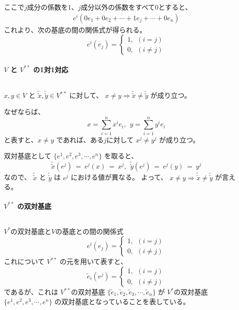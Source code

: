 \documentclass[uplatex,a4j,12pt,dvipdfmx]{jsarticle}
\begin{document}
ここで$j$成分の係数を1、$j$成分以外の係数をすべて0とすると、
\[
	\begin{array}{rcl}
		e^{i} (0 e_{1} + 0 e_{2}  + \cdots + 1 e_{j} + \cdots + 0 e_{n})
	\end{array}
\]
これより、次の基底の間の関係式が得られる。
\[
	e^{i}(e_{j})
	=
	\left\{
	\begin{array}{l}
		1, \ \ (i=j) \\
		0, \ \ (i \neq j)
	\end{array}
	\right.
\]

\paragraph{$V$ と $V^{**}$ の1対1対応}

${}$

$x,y \in V$ と $\tilde{\tilde{x}}, \tilde{\tilde{y}} \in V^{**}$ に対して、
$x \neq y \Rightarrow \tilde{\tilde{x}} \neq \tilde{\tilde{y}}$ が成り立つ。

なぜならば、
$$
	x = \sum_{i=1}^{n} x^{i} e_{i} , \ \
	y = \sum_{i=1}^{n} y^{i} e_{i}
$$
と表すと、$x \neq y$ であれば、ある$j$に対して
$x^{j} \neq y^{j}$ が成り立つ。

双対基底として
$\{ e^{1}, e^{2}, e^{3}, \cdots , e^{n} \}$
を取ると、
$$
	\tilde{\tilde{x}}(e^{j})
	\ = \
	e^{j}(x)
	\ = \
	x^{j}
	, \ \
	\tilde{\tilde{y}}(e^{j})
	\ = \
	e^{j}(y)
	\ = \
	y^{j}
$$
なので、
$\tilde{\tilde{x}}$ と $\tilde{\tilde{y}}$ は $e^{j}$ における値が異なる。
よって、
$x \neq y \Rightarrow \tilde{\tilde{x}} \neq \tilde{\tilde{y}}$
が言える。

\paragraph{$V^{**}$ の双対基底}

${}$

$V^{*}$の双対基底と$V$の基底との間の関係式
\[
	e^{i}(e_{j})
	=
	\left\{
	\begin{array}{l}
		1, \ \ (i=j) \\
		0, \ \ (i \neq j)
	\end{array}
	\right.
\]
これについて $V^{**}$ の元を用いて表すと、
\[
	\tilde{e}_{i}(e^{j})
	=
	\left\{
	\begin{array}{l}
		1, \ \ (i=j) \\
		0, \ \ (i \neq j)
	\end{array}
	\right.
\]
であるが、これは
$V^{**}$の双対基底
$\{ \tilde{e}_{1}, \tilde{e}_{2}, \tilde{e}_{3}, \cdots , \tilde{e}_{n} \}$
が
$V^{*}$の双対基底
$\{ e^{1}, e^{2}, e^{3}, \cdots , e^{n} \}$
の双対基底となっていることを表している。
\end{document}
